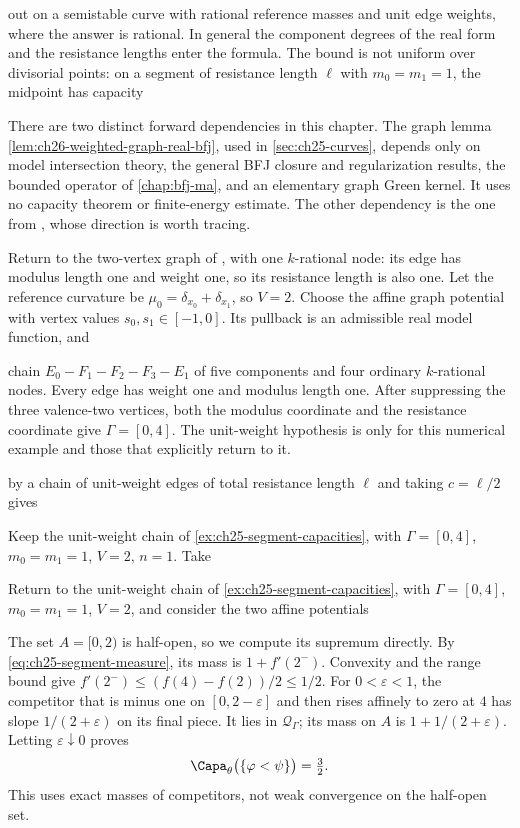 out on a semistable curve with rational reference masses and unit edge
weights, where the answer is rational.  In general the component degrees
of the real form and the resistance lengths enter the formula.  The bound
is not uniform over divisorial points: on a segment of resistance length
\(\ell\) with \(m_0=m_1=1\), the midpoint has capacity

There are two distinct forward dependencies in this chapter.
The graph lemma \cref{lem:ch26-weighted-graph-real-bfj}, used in
\cref{sec:ch25-curves}, depends only on model intersection theory,
the general BFJ closure and regularization results, the bounded operator
of \cref{chap:bfj-ma}, and an elementary graph Green kernel.
It uses no capacity theorem or finite-energy estimate.
The other dependency is the one from ,
whose direction is worth tracing.

Return to the two-vertex graph of , with one
\(k\)-rational node: its edge has modulus length one and weight one,
so its resistance length is also one.  Let the reference curvature be
\(\mu_0=\delta_{x_0}+\delta_{x_1}\), so \(V=2\).
Choose the affine graph potential with vertex values
\(s_0,s_1\in[-1,0]\).  Its pullback is an admissible real model
function, and

chain \(E_0-F_1-F_2-F_3-E_1\) of five components and four ordinary
\(k\)-rational nodes.  Every edge has weight one and modulus length
one.  After suppressing the three valence-two vertices, both the
modulus coordinate and the resistance coordinate give
\(\Gamma=[0,4]\).  The unit-weight hypothesis is only for this
numerical example and those that explicitly return to it.

by a chain of unit-weight edges of total resistance length \(\ell\)
and taking \(c=\ell/2\) gives

Keep the unit-weight chain of \cref{ex:ch25-segment-capacities},
with \(\Gamma=[0,4]\), \(m_0=m_1=1\), \(V=2\), \(n=1\).  Take

Return to the unit-weight chain of
\cref{ex:ch25-segment-capacities}, with \(\Gamma=[0,4]\),
\(m_0=m_1=1\), \(V=2\), and consider the two affine potentials

The set \(A=[0,2)\) is half-open, so we compute its supremum directly.
By \eqref{eq:ch25-segment-measure}, its mass is \(1+f'(2^-)\).
Convexity and the range bound give
\(f'(2^-)\leq(f(4)-f(2))/2\leq1/2\).
For \(0<\varepsilon<1\), the competitor that is minus one on
\([0,2-\varepsilon]\) and then rises affinely to zero at \(4\)
has slope \(1/(2+\varepsilon)\) on its final piece.
It lies in \(\mathcal Q_\Gamma\); its mass on \(A\) is
\(1+1/(2+\varepsilon)\).
Letting \(\varepsilon\downarrow0\) proves
\[
 \Capa_\theta\bigl(\{\varphi<\psi\}\bigr)=\tfrac32 .
\]
This uses exact masses of competitors, not weak convergence on the
half-open set.

